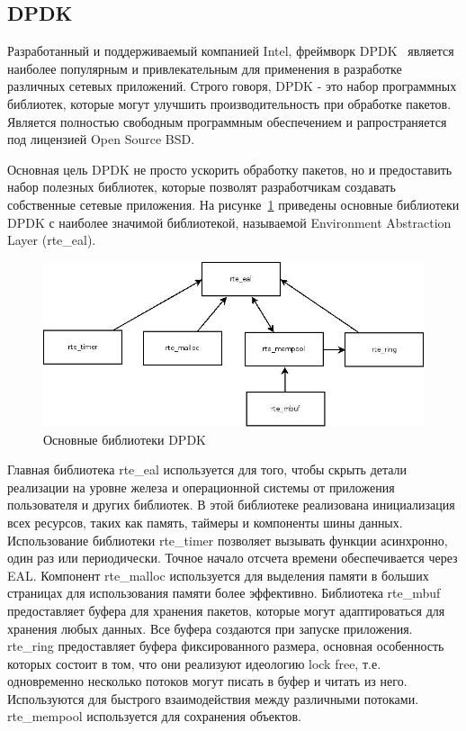 \subsection{DPDK}
Разработанный и поддерживаемый компанией Intel, фреймворк DPDK~\cite{dpdk_descr} является наиболее популярным и привлекательным для применения в разработке различных сетевых приложений. Строго говоря, DPDK - это набор программных библиотек, которые могут улучшить производительность при обработке пакетов. Является полностью свободным программным обеспечением и рапространяется под лицензией Open Source BSD.

Основная цель DPDK не просто ускорить обработку пакетов, но и предоставить набор полезных библиотек, которые позволят разработчикам создавать собственные сетевые приложения. На рисунке~\ref{pic:dpdk_eal} приведены основные библиотеки DPDK с наиболее значимой библиотекой, называемой Environment Abstraction Layer (rte\_eal).
\begin{figure}
\centering
\includegraphics[scale=0.5]{pictures/dpdk_eal}
\caption{Основные библиотеки DPDK}
\label{pic:dpdk_eal}
\end{figure}

Главная библиотека rte\_eal используется для того, чтобы скрыть детали реализации на уровне железа и операционной системы от приложения пользователя и других библиотек. В этой библиотеке реализована инициализация всех ресурсов, таких как память, таймеры и компоненты шины данных. Использование библиотеки rte\_timer позволяет вызывать функции асинхронно, один раз или периодически. Точное начало отсчета времени обеспечивается через EAL. Компонент rte\_malloc используется для выделения памяти в больших страницах для использования памяти более эффективно. Библиотека rte\_mbuf предоставляет буфера для хранения пакетов, которые могут адаптироваться для хранения любых данных. Все буфера создаются при запуске приложения. rte\_ring предоставляет буфера фиксированного размера, основная особенность которых состоит в том, что они реализуют идеологию lock free, т.е. одновременно несколько потоков могут писать в буфер и читать из него. Используются для быстрого взаимодействия между различными потоками. rte\_mempool используется для сохранения объектов.

